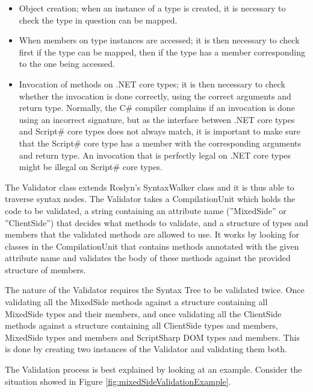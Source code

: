 		\begin{itemize}
			\item Object creation; when an instance of a type is created, it is necessary to check the type in question can be mapped.
			\item When members on type instances are accessed; it is then necessary to check first if the type can be mapped, then if the type has a member corresponding to the one being accessed.
			\item Invocation of methods on .NET core types; it is then necessary to check whether the invocation is done correctly, using the correct arguments and return type. Normally, the C\# compiler complains if an invocation is done using an incorrect signature, but as the interface between .NET core types and Script\# core types does not always match, it is important to make sure that the Script\# core type has a member with the corresponding arguments and return type. An invocation that is perfectly legal on .NET core types might be illegal on Script\# core types.
		\end{itemize}

		The Validator class extends Roslyn's SyntaxWalker class and it is thus able to traverse syntax nodes. The Validator takes a CompilationUnit which holds the code to be validated, a string containing an attribute name (''MixedSide'' or ''ClientSide'') that decides what methods to validate, and a structure of types and members that the validated methods are allowed to use. It works by looking for classes in the CompilationUnit that contains methods annotated with the given attribute name and validates the body of these methods against the provided structure of members.

		The nature of the Validator requires the Syntax Tree to be validated twice. Once validating all the MixedSide methods against a structure containing all MixedSide types and their members, and once validating all the ClientSide methods against a structure containing all ClientSide types and members, MixedSide types and members and ScriptSharp DOM types and members. This is done by creating two instances of the Validator and validating them both.

		The Validation process is best explained by looking at an example. Consider the situation showed in Figure \ref{fig:mixedSideValidationExample}. 


